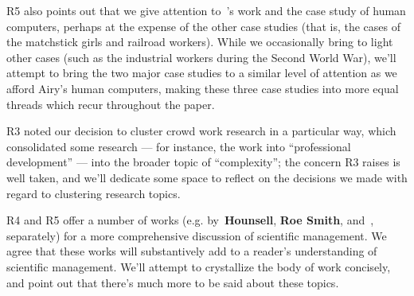 \documentclass[11pt]{article}
\begin{document}
R5 also points out that we give attention to~\citeauthor{grier2013computers}'s work and
the case study of human computers,
perhaps at the expense of the other case studies
(that is, the cases of the matchstick girls and railroad workers).
While we occasionally bring to light other cases
(such as the industrial workers during the Second World War),
we'll attempt to bring the two major case studies to
a similar level of attention as we afford Airy's human computers,
making these three case studies into
more equal threads which recur throughout the paper.

R3 noted our decision to cluster crowd work research in a particular way,
which consolidated some research
--- for instance, the work into ``professional development'' ---
into the broader topic of ``complexity'';
the concern R3 raises is well taken, and
we'll dedicate some space to reflect on
the decisions we made with regard to clustering research topics.

R4 and R5 offer a number of works
(e.g. by~\textbf{Hounsell}, \textbf{Roe Smith}, and~\citeauthor{williamson2016},
separately)
for a more comprehensive discussion of scientific management.
We agree that these works will
substantively add to a reader's understanding of scientific management.
We'll attempt to crystallize the body of work concisely, and
point out that there's much more to be said about these topics.








\printbibliography{}
\end{document}

